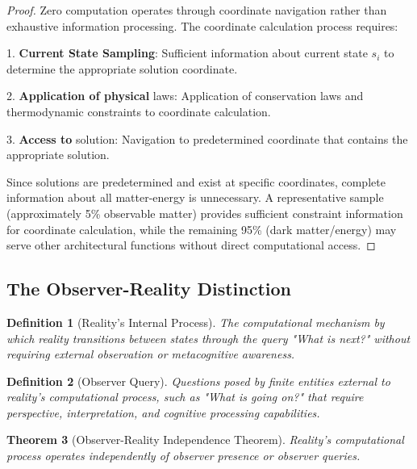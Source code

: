 \documentclass[12pt,a4paper]{article}
\newtheorem{theorem}{Theorem}[section]
\newtheorem{definition}[theorem]{Definition}
\begin{document}
\begin{proof}
Zero computation operates through coordinate navigation rather than exhaustive information processing. The coordinate calculation process requires:

1. \textbf{Current State Sampling}: Sufficient information about current state $s_i$ to determine the appropriate solution coordinate.

2. \textbf{Application of physical} laws: Application of conservation laws and thermodynamic constraints to coordinate calculation.

3. \textbf{Access to} solution: Navigation to predetermined coordinate that contains the appropriate solution.

Since solutions are predetermined and exist at specific coordinates, complete information about all matter-energy is unnecessary. A representative sample (approximately 5\% observable matter) provides sufficient constraint information for coordinate calculation, while the remaining 95\% (dark matter/energy) may serve other architectural functions without direct computational access.
\end{proof}

\subsection{The Observer-Reality Distinction}

\begin{definition}[Reality's Internal Process]
The computational mechanism by which reality transitions between states through the query "What is next?" without requiring external observation or metacognitive awareness.
\end{definition}

\begin{definition}[Observer Query]
Questions posed by finite entities external to reality's computational process, such as "What is going on?" that require perspective, interpretation, and cognitive processing capabilities.
\end{definition}

\begin{theorem}[Observer-Reality Independence Theorem]
Reality's computational process operates independently of observer presence or observer queries.
\end{theorem}
\end{document}
